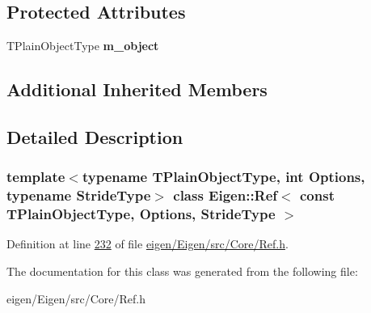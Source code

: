 \subsection*{Protected Attributes}
\begin{DoxyCompactItemize}
\item 
\mbox{\label{class_eigen_1_1_ref_3_01const_01_t_plain_object_type_00_01_options_00_01_stride_type_01_4_a717dd5ce1a92f509394fe4159cef5161}} 
T\+Plain\+Object\+Type {\bfseries m\+\_\+object}
\end{DoxyCompactItemize}
\subsection*{Additional Inherited Members}


\subsection{Detailed Description}
\subsubsection*{template$<$typename T\+Plain\+Object\+Type, int Options, typename Stride\+Type$>$\newline
class Eigen\+::\+Ref$<$ const T\+Plain\+Object\+Type, Options, Stride\+Type $>$}



Definition at line \hyperlink{eigen_2_eigen_2src_2_core_2_ref_8h_source_l00232}{232} of file \hyperlink{eigen_2_eigen_2src_2_core_2_ref_8h_source}{eigen/\+Eigen/src/\+Core/\+Ref.\+h}.



The documentation for this class was generated from the following file\+:\begin{DoxyCompactItemize}
\item 
eigen/\+Eigen/src/\+Core/\+Ref.\+h\end{DoxyCompactItemize}

